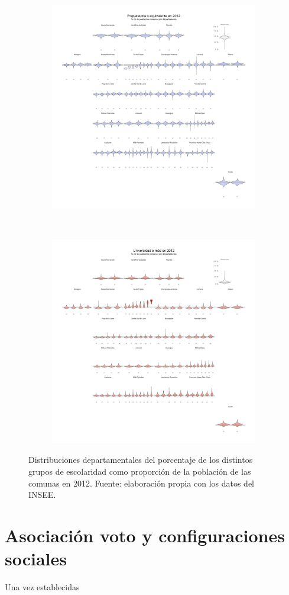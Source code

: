 \begin{figure}[h]
\begin{subfigure}{0.3\textwidth}
	\end{subfigure}
	~
	\begin{subfigure}{0.3\textwidth}
	\includegraphics[width = \textwidth]{Figs/AED/Geofacet_Distr_por_Dpto_Dip3_2012}
	\end{subfigure}
	~
	\begin{subfigure}{0.3\textwidth}
	\includegraphics[width = \textwidth]{Figs/AED/Geofacet_Distr_por_Dpto_Dip4_2012}
	\end{subfigure}
	\caption{Distribuciones departamentales del porcentaje de los distintos grupos de escolaridad como proporción de la población de las comunas en 2012. Fuente: elaboración propia con los datos del INSEE.}
	\label{fig:Distr_por_Dpto_Esc_2012}	
\end{figure}

\section{Asociación voto y configuraciones sociales}

Una vez establecidas